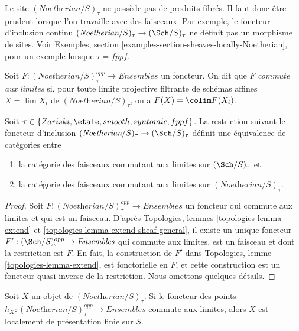 \begin{remark}[Avertissement]
\label{remark-no-fibre-products}
Le site $(\textit{Noetherian}/S)_\tau$ ne possède pas de produits fibrés.
Il faut donc être prudent lorsque l'on travaille avec des faisceaux. Par exemple,
le foncteur d'inclusion continu
$(\textit{Noetherian}/S)_\tau \to (\Sch/S)_\tau$
ne définit pas un morphisme de sites. Voir
Exemples, section \ref{examples-section-sheaves-locally-Noetherian},
pour un exemple lorsque $\tau = fppf$.
\end{remark}

\noindent
Soit $F : (\textit{Noetherian}/S)_\tau^{opp} \to \textit{Ensembles}$
un foncteur. On dit que $F$ {\it commute aux limites} si, pour toute
limite projective filtrante de schémas affines $X = \lim X_i$ de
$(\textit{Noetherian}/S)_\tau$, on a $F(X) = \colim F(X_i)$.

\begin{lemma}
\label{lemma-canonical-extension}
Soit $\tau \in \{Zariski, \etale, smooth, syntomic, fppf\}$.
La restriction suivant le foncteur d'inclusion
$(\textit{Noetherian}/S)_\tau \to (\Sch/S)_\tau$
définit une équivalence de catégories entre
\begin{enumerate}
\item la catégorie des faisceaux commutant aux limites sur
$(\Sch/S)_\tau$ et
\item la catégorie des faisceaux commutant aux limites sur
$(\textit{Noetherian}/S)_\tau$.
\end{enumerate}
\end{lemma}

\begin{proof}
Soit $F : (\textit{Noetherian}/S)_\tau^{opp} \to \textit{Ensembles}$
un foncteur qui commute aux limites et qui est un faisceau.
D'après Topologies, lemmes
\ref{topologies-lemma-extend} et \ref{topologies-lemma-extend-sheaf-general},
il existe un unique foncteur
$F' : (\Sch/S)_\tau^{opp} \to \textit{Ensembles}$
qui commute aux limites, est un faisceau et dont la restriction est $F$.
En fait, la construction de $F'$ dans
Topologies, lemme \ref{topologies-lemma-extend},
est fonctorielle en $F$, et cette construction est un foncteur quasi-inverse
de la restriction. Nous omettons quelques détails.
\end{proof}

\begin{lemma}
\label{lemma-representable-limit-preserving}
Soit $X$ un objet de $(\textit{Noetherian}/S)_\tau$. Si le foncteur
des points $h_X : (\textit{Noetherian}/S)_\tau^{opp} \to \textit{Ensembles}$
commute aux limites, alors $X$ est localement de présentation finie sur $S$.
\end{lemma}


